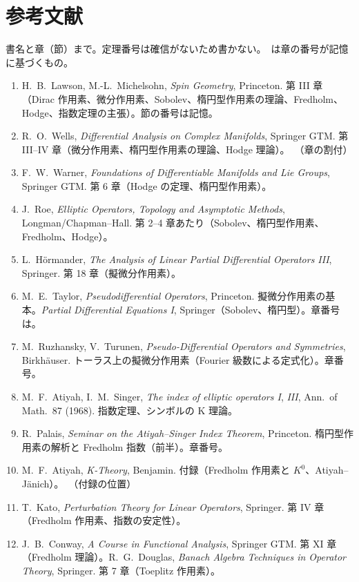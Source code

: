 \section*{参考文献}
書名と章（節）まで。定理番号は確信がないため書かない。\tQ\ は章の番号が記憶に基づくもの。
\begin{enumerate}
\item H.~B.~Lawson, M.-L.~Michelsohn, \emph{Spin Geometry}, Princeton. 第 III 章（Dirac 作用素、微分作用素、Sobolev、楕円型作用素の理論、Fredholm、Hodge、指数定理の主張）。節の番号は記憶\tQ。
\item R.~O.~Wells, \emph{Differential Analysis on Complex Manifolds}, Springer GTM. 第 III--IV 章（微分作用素、楕円型作用素の理論、Hodge 理論）。\tQ\ （章の割付）
\item F.~W.~Warner, \emph{Foundations of Differentiable Manifolds and Lie Groups}, Springer GTM. 第 6 章（Hodge の定理、楕円型作用素）。
\item J.~Roe, \emph{Elliptic Operators, Topology and Asymptotic Methods}, Longman/Chapman--Hall. 第 2--4 章あたり（Sobolev、楕円型作用素、Fredholm、Hodge）\tQ。
\item L.~Hörmander, \emph{The Analysis of Linear Partial Differential Operators III}, Springer. 第 18 章（擬微分作用素）。
\item M.~E.~Taylor, \emph{Pseudodifferential Operators}, Princeton. 擬微分作用素の基本。\emph{Partial Differential Equations I}, Springer（Sobolev、楕円型）。章番号は\tQ。
\item M.~Ruzhansky, V.~Turunen, \emph{Pseudo-Differential Operators and Symmetries}, Birkhäuser. トーラス上の擬微分作用素（Fourier 級数による定式化）。章番号\tQ。
\item M.~F.~Atiyah, I.~M.~Singer, \emph{The index of elliptic operators I}, \emph{III}, Ann.\ of Math.\ 87 (1968). 指数定理、シンボルの K 理論。
\item R.~Palais, \emph{Seminar on the Atiyah--Singer Index Theorem}, Princeton. 楕円型作用素の解析と Fredholm 指数（前半）。章番号\tQ。
\item M.~F.~Atiyah, \emph{K-Theory}, Benjamin. 付録（Fredholm 作用素と $K^0$、Atiyah--Jänich）。\tQ\ （付録の位置）
\item T.~Kato, \emph{Perturbation Theory for Linear Operators}, Springer. 第 IV 章（Fredholm 作用素、指数の安定性）。
\item J.~B.~Conway, \emph{A Course in Functional Analysis}, Springer GTM. 第 XI 章（Fredholm 理論）\tQ。R.~G.~Douglas, \emph{Banach Algebra Techniques in Operator Theory}, Springer. 第 7 章（Toeplitz 作用素）\tQ。

\end{enumerate}
